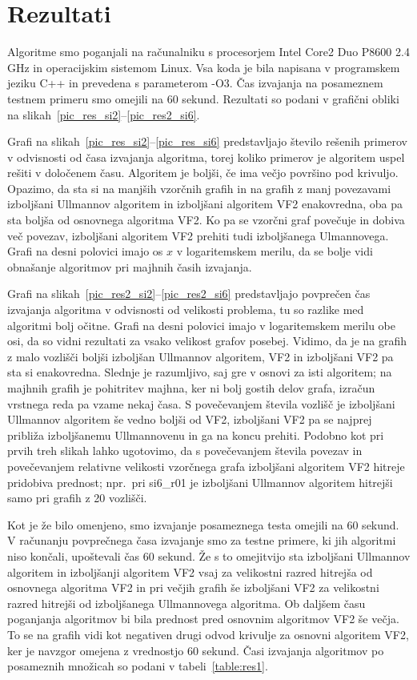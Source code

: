 \documentclass[a4paper, 12pt, ]{book}
\begin{document}
		
	\section{Rezultati}
	Algoritme smo poganjali na računalniku s procesorjem Intel Core2 Duo P8600 2.4 GHz in operacijskim sistemom Linux. Vsa koda je bila napisana v
	programskem jeziku C++ in prevedena s parameterom -O3. Čas izvajanja na posameznem testnem primeru smo omejili na 60 sekund. Rezultati so
	podani v grafični obliki na slikah~\ref{pic_res_si2}--\ref{pic_res2_si6}.
	
	Grafi na slikah~\ref{pic_res_si2}--\ref{pic_res_si6} predstavljajo število rešenih
	primerov v odvisnosti od časa izvajanja algoritma, torej koliko primerov je algoritem uspel rešiti v določenem času. Algoritem je boljši, če ima večjo
	površino pod krivuljo. Opazimo, da sta si na manjših vzorčnih grafih in na grafih z manj povezavami izboljšani Ullmannov algoritem in izboljšani algoritem
	VF2 enakovredna, oba pa sta boljša od osnovnega algoritma VF2. Ko pa se vzorčni graf povečuje in dobiva več povezav, izboljšani algoritem VF2 prehiti
	tudi izboljšanega Ulmannovega. Grafi na desni polovici imajo os $x$ v logaritemskem merilu, da se bolje vidi obnašanje algoritmov pri majhnih časih
	izvajanja.
	
	Grafi na slikah~\ref{pic_res2_si2}--\ref{pic_res2_si6} predstavljajo povprečen čas izvajanja algoritma v odvisnosti od velikosti problema, tu so
	razlike med algoritmi bolj očitne. Grafi na desni polovici imajo v logaritemskem merilu obe osi, da so vidni rezultati za vsako velikost grafov posebej.
	Vidimo, da je na grafih z malo vozlišči boljši izboljšan Ullmannov algoritem, VF2 in izboljšani VF2 pa sta si enakovredna. Slednje je razumljivo, saj 
	gre v osnovi za isti algoritem; na majhnih grafih je pohitritev majhna, ker ni bolj gostih delov grafa, izračun vrstnega reda pa vzame nekaj časa.	
	S povečevanjem števila vozlišč je izboljšani Ullmannov algoritem še vedno boljši od VF2, izboljšani VF2 pa se najprej
	približa izboljšanemu Ullmannovenu in ga na koncu prehiti. Podobno kot pri prvih treh slikah lahko ugotovimo, da s povečevanjem števila povezav
	in povečevanjem relativne velikosti vzorčnega grafa izboljšani algoritem VF2 hitreje pridobiva prednost; npr.~pri si6\_r01 je izboljšani Ullmannov
	algoritem hitrejši samo pri grafih z 20 vozlišči. 
	
	Kot je že bilo omenjeno, smo izvajanje posameznega testa omejili na 60 sekund. V računanju 
	povprečnega časa izvajanje smo za testne primere, ki jih algoritmi niso končali, upoštevali čas 60 sekund. Že s to omejitvijo sta izboljšani Ullmannov
	algoritem in izboljšanji algoritem VF2 vsaj za velikostni razred hitrejša od osnovnega algoritma VF2 in pri večjih grafih še izboljšani VF2 za velikostni
	razred hitrejši od izboljšanega Ullmannovega algoritma. Ob daljšem času poganjanja algoritmov bi bila prednost pred osnovnim algoritmov VF2 še večja.
	To se na grafih vidi kot negativen drugi odvod krivulje za osnovni algoritem VF2, ker je navzgor omejena z vrednostjo 60 sekund. Časi izvajanja 
	algoritmov po posameznih množicah so podani v tabeli~\ref{table:res1}.
	
\end{document}
